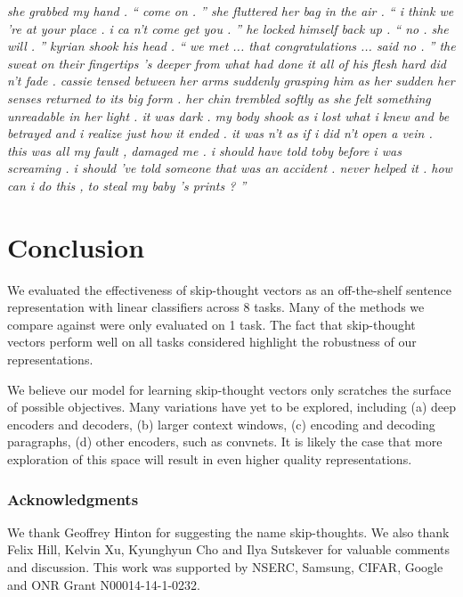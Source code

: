\documentclass{article} \usepackage{nips15submit_e,times}
\begin{document}
\small{ {\it
she grabbed my hand .
`` come on . ''
she fluttered her bag in the air .
`` i think we 're at your place .
i ca n't come get you . ''
he locked himself back up .
`` no .
she will . ''
kyrian shook his head .
`` we met ... that congratulations ... said no . ''
the sweat on their fingertips 's deeper from what had done it all of his flesh hard did n't fade .
cassie tensed between her arms suddenly grasping him as her sudden her senses returned to its big form .
her chin trembled softly as she felt something unreadable in her light .
it was dark .
my body shook as i lost what i knew and be betrayed and i realize just how it ended .
it was n't as if i did n't open a vein .
this was all my fault , damaged me .
i should have told toby before i was screaming .
i should 've told someone that was an accident .
never helped it .
how can i do this , to steal my baby 's prints ? ''
}}
\normalsize


\section{Conclusion}

We evaluated the effectiveness of skip-thought vectors as an off-the-shelf sentence representation with linear classifiers across 8 tasks. Many of the methods we compare against were only evaluated on 1 task. The fact that skip-thought vectors perform well on all tasks considered highlight the robustness of our representations.

We believe our model for learning skip-thought vectors only scratches the surface of possible objectives. Many variations have yet to be explored, including (a) deep encoders and decoders, (b) larger context windows, (c) encoding and decoding paragraphs, (d) other encoders, such as convnets. It is likely the case that more exploration of this space will result in even higher quality representations.

\subsubsection*{Acknowledgments}

We thank Geoffrey Hinton for suggesting the name skip-thoughts. We also thank Felix Hill, Kelvin Xu, Kyunghyun Cho and Ilya Sutskever for valuable comments and discussion. This work was supported by NSERC, Samsung, CIFAR, Google and ONR Grant N00014-14-1-0232.


\small{}
\small{}
\end{document}
